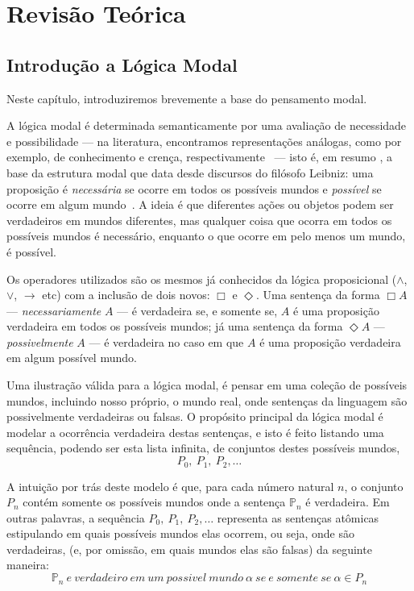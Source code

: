 \chapter{Revisão Teórica}
\section{Introdução a Lógica Modal}
\label{sec:l_gica_modal}
Neste capítulo, introduziremos brevemente a base do pensamento modal. 

A lógica modal é determinada semanticamente por uma avaliação de necessidade e
possibilidade --- na literatura, encontramos representações análogas, como por
exemplo, de conhecimento e crença, respectivamente~\cite{belief} --- isto é, em resumo %
, a base da estrutura
modal que data desde discursos do filósofo Leibniz: uma proposição é
\textit{necessária} se ocorre em todos os possíveis mundos e \textit{possível}
se ocorre em algum mundo~\cite{chellas:modal_logic}.  A ideia é que
diferentes ações ou objetos podem ser verdadeiros em mundos diferentes, mas
qualquer coisa que
ocorra em todos os possíveis mundos é necessário, enquanto o que ocorre em pelo
menos um mundo, é possível.


Os operadores utilizados são os mesmos já conhecidos da lógica proposicional
($\wedge$, $\vee$, $\rightarrow$ etc) com a inclusão de dois novos: $\Box$ e
$\Diamond$.
Uma sentença da forma $\Box A$ --- \textit{necessariamente} $A$ --- é verdadeira se,
e somente se, $A$ é uma proposição verdadeira em todos os possíveis mundos; já
uma sentença da forma $\Diamond A$ --- \textit{possivelmente} $A$ --- é verdadeira
no caso em que $A$ é uma proposição verdadeira em algum possível mundo.

Uma ilustração válida para a lógica modal, é pensar em uma coleção de possíveis
mundos, incluindo nosso próprio, o mundo real, onde sentenças da linguagem são
possivelmente verdadeiras ou falsas. O propósito principal da lógica modal é
modelar a ocorrência verdadeira destas sentenças, e isto é feito listando uma
sequência, podendo ser esta lista infinita, de conjuntos destes possíveis mundos,
\begin{equation}
    P_0,\ P_1,\ P_2,\ldots
\end{equation}

A intuição por trás deste modelo é que, para cada número natural $n$, o conjunto
$P_n$ contém somente os possíveis mundos onde a sentença $\mathbb{P}_n$ é
verdadeira. Em outras palavras, a sequência 
$P_0,\ P_1,\ P_2,\ldots$
representa as sentenças at\^omicas estipulando em quais possíveis mundos elas
ocorrem, ou seja, onde são verdadeiras,
(e, por omissão, em quais mundos elas são falsas) da seguinte maneira:
\begin{equation}
    \mathbb{P}_n\ e\ verdadeiro\ em\ um\ possivel\ mundo\ \alpha\ se\ e\
    somente\ se\
    \alpha \in P_n 
\end{equation}

